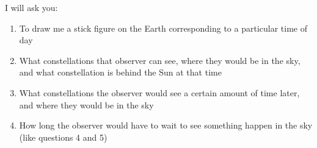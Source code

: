 \documentclass[12pt]{article}
\begin{document}
I will ask you:

\begin{enumerate}
	\item To draw me a stick figure on the Earth corresponding to a particular time of day
	
	\item What constellations that observer can see, where they would be in the sky, and what constellation is behind the Sun at that time
	
	\item What constellations the observer would see a certain amount of time later, and where they would be in the sky
	
	\item How long the observer would have to wait to see something happen in the sky (like questions 4 and 5)


\end{enumerate}
\end{document}
